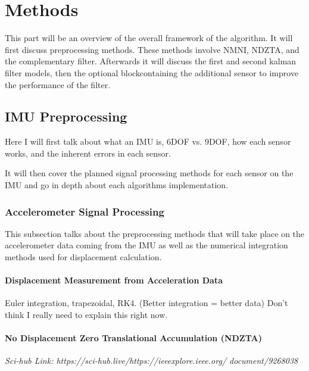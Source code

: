 \chapter{Methods}
\label{mathchapter}

This part will be an overview of the overall framework of the algorithm. It
will first discuss preprocessing methods. These methods involve NMNI, NDZTA,
and the complementary filter. Afterwards it will discuss the first and second 
kalman filter models, then the optional blockcontaining the additional sensor 
to improve the performance of the filter.


\section{IMU Preprocessing}

Here I will first talk about what an IMU is, 6DOF vs. 9DOF, how each sensor
works, and the inherent errors in each sensor. 

It will then cover the planned signal processing methods for each sensor on the 
IMU and go in depth about each algorithms implementation.

\subsection{Accelerometer Signal Processing}

This subsection talks about the preprocessing methods that will take place on
the accelerometer data coming from the IMU as well as the numerical integration 
methods used for displacement calculation.

\subsubsection{Displacement Measurement from Acceleration Data}

Euler integration, trapezoidal, RK4. (Better integration = better data) 
Don't think I really need to explain this right now.

\subsubsection{No Displacement Zero Translational Accumulation (NDZTA)}

\emph{Sci-hub Link: https://sci-hub.live/https://ieeexplore.ieee.org/
document/9268038 \\ }

